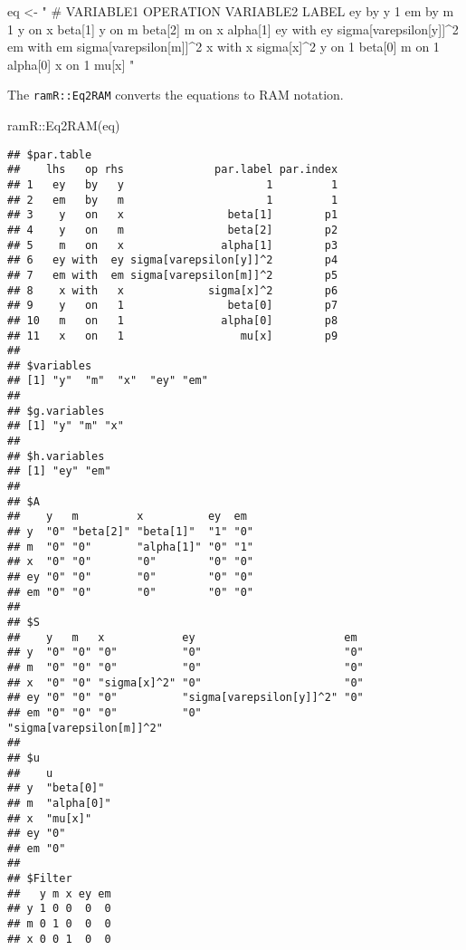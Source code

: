 \documentclass[
]{book}
\newenvironment{Shaded}{\begin{snugshade}}{\end{snugshade}}
\newcommand{\FunctionTok}[1]{\textcolor[rgb]{0.00,0.00,0.00}{#1}}
\newcommand{\NormalTok}[1]{#1}
\newcommand{\OtherTok}[1]{\textcolor[rgb]{0.56,0.35,0.01}{#1}}
\newcommand{\SpecialCharTok}[1]{\textcolor[rgb]{0.00,0.00,0.00}{#1}}
\newcommand{\StringTok}[1]{\textcolor[rgb]{0.31,0.60,0.02}{#1}}
\theoremstyle{definition}
\theoremstyle{definition}
\theoremstyle{definition}
\theoremstyle{remark}
\begin{document}
\begin{Shaded}
\begin{Highlighting}[]
\NormalTok{eq }\OtherTok{\textless{}{-}} \StringTok{"}
\StringTok{  \# VARIABLE1 OPERATION VARIABLE2 LABEL}
\StringTok{  ey          by        y         1}
\StringTok{  em          by        m         1}
\StringTok{  y           on        x         beta[1]}
\StringTok{  y           on        m         beta[2]}
\StringTok{  m           on        x         alpha[1]}
\StringTok{  ey          with      ey        sigma[varepsilon[y]]\^{}2}
\StringTok{  em          with      em        sigma[varepsilon[m]]\^{}2}
\StringTok{  x           with      x         sigma[x]\^{}2}
\StringTok{  y           on        1         beta[0]}
\StringTok{  m           on        1         alpha[0]}
\StringTok{  x           on        1         mu[x]}
\StringTok{"}
\end{Highlighting}
\end{Shaded}

The \texttt{ramR::Eq2RAM} converts the equations to RAM notation.

\begin{Shaded}
\begin{Highlighting}[]
\NormalTok{ramR}\SpecialCharTok{::}\FunctionTok{Eq2RAM}\NormalTok{(eq)}
\end{Highlighting}
\end{Shaded}

\begin{verbatim}
## $par.table
##    lhs   op rhs              par.label par.index
## 1   ey   by   y                      1         1
## 2   em   by   m                      1         1
## 3    y   on   x                beta[1]        p1
## 4    y   on   m                beta[2]        p2
## 5    m   on   x               alpha[1]        p3
## 6   ey with  ey sigma[varepsilon[y]]^2        p4
## 7   em with  em sigma[varepsilon[m]]^2        p5
## 8    x with   x             sigma[x]^2        p6
## 9    y   on   1                beta[0]        p7
## 10   m   on   1               alpha[0]        p8
## 11   x   on   1                  mu[x]        p9
## 
## $variables
## [1] "y"  "m"  "x"  "ey" "em"
## 
## $g.variables
## [1] "y" "m" "x"
## 
## $h.variables
## [1] "ey" "em"
## 
## $A
##    y   m         x          ey  em 
## y  "0" "beta[2]" "beta[1]"  "1" "0"
## m  "0" "0"       "alpha[1]" "0" "1"
## x  "0" "0"       "0"        "0" "0"
## ey "0" "0"       "0"        "0" "0"
## em "0" "0"       "0"        "0" "0"
## 
## $S
##    y   m   x            ey                       em                      
## y  "0" "0" "0"          "0"                      "0"                     
## m  "0" "0" "0"          "0"                      "0"                     
## x  "0" "0" "sigma[x]^2" "0"                      "0"                     
## ey "0" "0" "0"          "sigma[varepsilon[y]]^2" "0"                     
## em "0" "0" "0"          "0"                      "sigma[varepsilon[m]]^2"
## 
## $u
##    u         
## y  "beta[0]" 
## m  "alpha[0]"
## x  "mu[x]"   
## ey "0"       
## em "0"       
## 
## $Filter
##   y m x ey em
## y 1 0 0  0  0
## m 0 1 0  0  0
## x 0 0 1  0  0
\end{verbatim}
\end{document}
